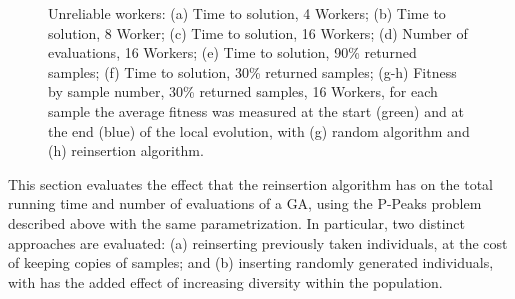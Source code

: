 \begin{figure}[htp]
{        \label{fig:plot_percent_90}
    }
    \caption{Unreliable workers: (a) Time to solution, 4 Workers; (b) Time to solution, 8 Worker;
    (c) Time to solution, 16 Workers; (d) Number of evaluations, 16 Workers; (e) Time to solution, 90\% returned samples;
    (f) Time to solution, 30\% returned samples; (g-h) Fitness by sample number, 30\% returned samples, 16 Workers,
    for each sample the average fitness was measured at the start (green) and at the end (blue) of the local evolution, with (g) random algorithm and
    (h) reinsertion algorithm.  }
    \label{fig:effort_unreliable}
\end{figure}


This section evaluates the effect that the reinsertion algorithm has on the total
running time and number of evaluations of a GA, using the P-Peaks problem described above with the same parametrization.
In particular, two distinct approaches are evaluated: (a) reinserting previously taken individuals, at the cost of keeping copies of
samples; and (b) inserting randomly generated individuals, with has the added effect of increasing diversity within the population.

